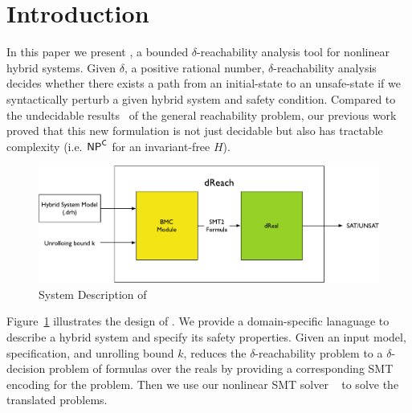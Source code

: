 \section{Introduction}

In this paper we present \dReach{}, a bounded $\delta$-reachability
analysis tool for nonlinear hybrid systems. Given $\delta$, a positive
rational number, $\delta$-reachability analysis decides whether there
exists a path from an initial-state to an unsafe-state if we
syntactically perturb a given hybrid system and safety condition.
Compared to the undecidable results~\cite{?} of the general
reachability problem, our previous
work~\cite{DBLP:journals/corr/GaoKCC14} proved that this new
formulation is not just decidable but also has tractable complexity
(i.e. $\mathsf{NP}^{\mathsf{C}}$ for an invariant-free $H$).

\begin{figure}
  \centering
  \includegraphics[width=\textwidth]{images/dReach}
  \caption{System Description of \dReach{}}
  \label{fig:system-description}
\end{figure}

Figure~\ref{fig:system-description} illustrates the design of
\dReach{}. We provide a domain-specific lanaguage to describe a hybrid
system and specify its safety properties. Given an input model,
specification, and unrolling bound $k$, \dReach{} reduces the
$\delta$-reachability problem to a $\delta$-decision problem of
formulas over the reals by providing a corresponding SMT encoding for
the problem. Then we use our nonlinear SMT solver
\dReal{}~\cite{DBLP:conf/cade/GaoKC13} to solve the translated problems.











